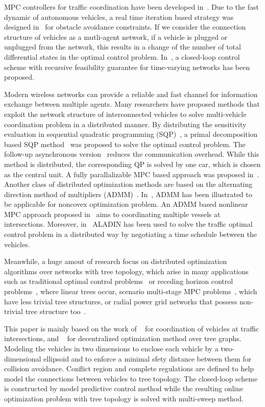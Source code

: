 \documentclass[letterpaper, 10 pt, conference]{ieeeconf}
\begin{document}
MPC controllers for traffic coordination have been developed in~\cite{Campos2013,Campos2014}. Due to the fast dynamic of autonomous vehicles, a real time iteration based strategy was designed in~\cite{Frasch2013} for obstacle avoidance constraints. If we consider the connection structure of vehicles as a mutli-agent network, if a vehicle is plugged or unplugged from the network, this results in a change of the number of total differential states in the optimal control problem. In~\cite{Shi2018}, a closed-loop control scheme with recursive feasibility guarantee for time-varying networks has been proposed. 

Modern wireless networks can provide a reliable and fast channel for information exchange between multiple agents. Many researchers have proposed methods that exploit the network structure of interconnected vehicles to solve multi-vehicle coordination problem in a distributed manner. By distributing the sensitivity evaluation in sequential quadratic programming (SQP)~\cite{Nocedal2006}, a primal decomposition based SQP method~\cite{Hult2016} was proposed to solve the optimal control problem. The follow-up asynchronous version~\cite{Zanon2017} reduces the communication overhead. While this method is distributed, the corresponding QP is solved by one car, which is chosen as the central unit. A fully parallalizable MPC based approach was proposed in~\cite{Katriniok2017}. Another class of distributed optimization methods are based on the alternating direction method of multipliers (ADMM)~\cite{Boyd2011}. In~\cite{Wang2015}, ADMM has been illustrated to be applicable for noncovex optimization problem. An ADMM based nonlinear MPC approach proposed in~\cite{Ferranti2018} aims to coordinating multiple vessels at intersections. Moreover, in~\cite{Jiang2017} ALADIN has been used to solve the traffic optimal control problem in a distributed way by negotiating a time schedule between the vehicles. 

Meanwhile, a huge amout of research focus on distributed optimization algorithms over networks with tree topology, which arise in many applications such as traditional optimal control problems~\cite{Bellman1966} or receding horizon control problems~\cite{Ljung1999}, where linear trees occur, scenario multi-stage MPC problems~\cite{Bernardini2011,Kouzoupis2018,Lucia2014}, which have less trivial tree structures, or radial power grid networks that possess non-trivial tree structure too~\cite{Kekatos2012,Peng2014}.

This paper is mainly based on the work of ~\cite{Jiang2017,Shi2018} for coordination of vehicles at traffic intersections, and ~\cite{JiangTree} for decentralized optimization method over tree graphs. Modeling the vehicles in two dimensions to enclose each vehicle by a two-dimensional ellipsoid and to enforce a minimal sfety distance between them for collision avoidance. Conflict region and complete regulations are defined to help model the connections between vehicles to tree topology. The closed-loop scheme is constructed by model predictive control method while the resulting online optimization problem with tree topology is solved with multi-sweep method. 
\end{document}
